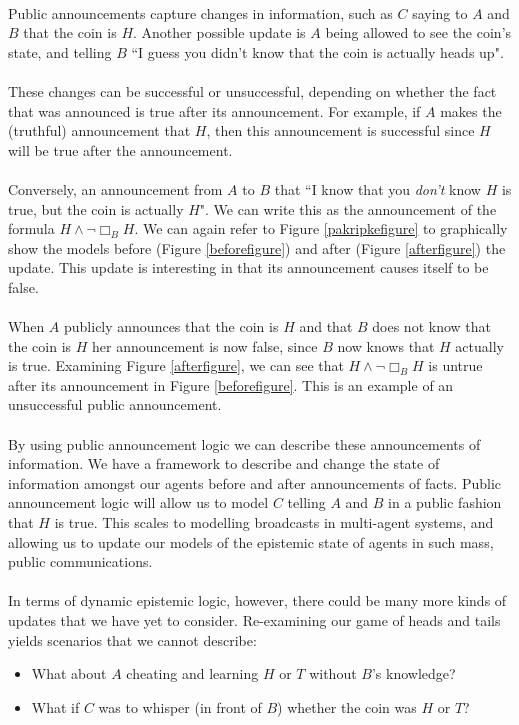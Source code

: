 \documentclass[12pt, a4paper, titlepage]{scrartcl}
\begin{document}
\\
Public announcements capture changes in information, such as $C$ saying to
$A$ and $B$ that the coin is $H$.
Another possible update is $A$ being allowed to see the coin's state, and
telling $B$ ``I guess you didn't know that the coin is actually heads up".\\
\\
These changes can be successful or unsuccessful, depending on whether the fact
that was announced is true after its announcement.
For example, if $A$ makes the (truthful) announcement that $H$, then this
announcement is successful since $H$ will be true after the announcement.\\
\\
Conversely, an announcement from $A$ to $B$ that ``I know that you {\em don't} know $H$
is true, but the coin is actually $H$".
We can write this as the announcement of the formula $H \land \neg \Box_B H$.
We can again refer to Figure \ref{pakripkefigure} to graphically show the models
before (Figure \ref{beforefigure}) and after (Figure \ref{afterfigure}) the update.
This update is interesting in that its announcement causes itself to be false.\\
\\
When $A$ publicly announces that the coin is $H$ and that $B$ does not know that
the coin is $H$ her announcement is now false, since $B$ now knows that $H$
actually is true.
Examining Figure \ref{afterfigure}, we can see that $H \land \neg \Box_B H$ is
untrue after its announcement in Figure \ref{beforefigure}.
This is an example of an unsuccessful public announcement.\\
\\
By using public announcement logic we can describe these announcements of
information.
We have a framework to describe and change the state of information amongst our
agents before and after announcements of facts.
Public announcement logic will allow us to model $C$ telling $A$ and $B$ in a
public fashion that $H$ is true.
This scales to modelling broadcasts in multi-agent systems, and allowing us to
update our models of the epistemic state of agents in such mass, public communications.\\
\\
In terms of dynamic epistemic logic, however, there could be many more kinds of
updates that we have yet to consider.
Re-examining our game of heads and tails yields scenarios that we cannot
describe:
\begin{itemize}
	\item What about $A$ cheating and learning $H$ or $T$ without $B$'s knowledge?
	\item What if $C$ was to whisper (in front of $B$) whether the coin was $H$
	or $T$?
\end{itemize}
\end{document}
